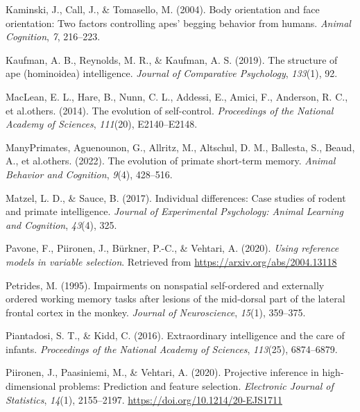 \documentclass[
  man,floatsintext]{apa6}
\newlength{\cslhangindent}
\newlength{\cslentryspacingunit} %
\newenvironment{CSLReferences}[2] %
 {%
  \setlength{\parindent}{0pt}
  \ifodd #1
  \let\oldpar\par
  \def\par{\hangindent=\cslhangindent\oldpar}
  \fi
  \setlength{\parskip}{#2\cslentryspacingunit}
 }%
 {}
\begin{document}
\begin{CSLReferences}{1}{0}
\leavevmode{}%
Kaminski, J., Call, J., \& Tomasello, M. (2004). Body orientation and face orientation: Two factors controlling apes' begging behavior from humans. \emph{Animal Cognition}, \emph{7}, 216--223.

\leavevmode{}%
Kaufman, A. B., Reynolds, M. R., \& Kaufman, A. S. (2019). The structure of ape (hominoidea) intelligence. \emph{Journal of Comparative Psychology}, \emph{133}(1), 92.

\leavevmode{}%
MacLean, E. L., Hare, B., Nunn, C. L., Addessi, E., Amici, F., Anderson, R. C., et al.others. (2014). The evolution of self-control. \emph{Proceedings of the National Academy of Sciences}, \emph{111}(20), E2140--E2148.

\leavevmode{}%
ManyPrimates, Aguenounon, G., Allritz, M., Altschul, D. M., Ballesta, S., Beaud, A., et al.others. (2022). The evolution of primate short-term memory. \emph{Animal Behavior and Cognition}, \emph{9}(4), 428--516.

\leavevmode{}%
Matzel, L. D., \& Sauce, B. (2017). Individual differences: Case studies of rodent and primate intelligence. \emph{Journal of Experimental Psychology: Animal Learning and Cognition}, \emph{43}(4), 325.

\leavevmode{}%
Pavone, F., Piironen, J., Bürkner, P.-C., \& Vehtari, A. (2020). \emph{Using reference models in variable selection}. Retrieved from \url{https://arxiv.org/abs/2004.13118}

\leavevmode{}%
Petrides, M. (1995). Impairments on nonspatial self-ordered and externally ordered working memory tasks after lesions of the mid-dorsal part of the lateral frontal cortex in the monkey. \emph{Journal of Neuroscience}, \emph{15}(1), 359--375.

\leavevmode{}%
Piantadosi, S. T., \& Kidd, C. (2016). Extraordinary intelligence and the care of infants. \emph{Proceedings of the National Academy of Sciences}, \emph{113}(25), 6874--6879.

\leavevmode{}%
Piironen, J., Paasiniemi, M., \& Vehtari, A. (2020). {Projective inference in high-dimensional problems: Prediction and feature selection}. \emph{Electronic Journal of Statistics}, \emph{14}(1), 2155--2197. \url{https://doi.org/10.1214/20-EJS1711}


\end{CSLReferences}
\end{document}
